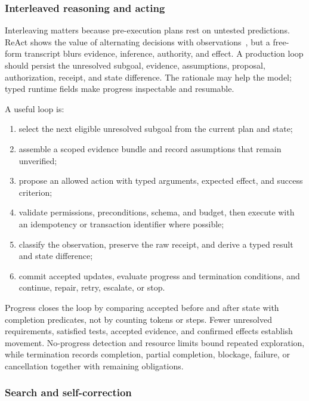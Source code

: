 \subsubsection{Interleaved reasoning and acting}

Interleaving matters because pre-execution plans rest on untested predictions. ReAct shows the value of alternating decisions with observations~\cite{yao2023react}, but a free-form transcript blurs evidence, inference, authority, and effect. A production loop should persist the unresolved subgoal, evidence, assumptions, proposal, authorization, receipt, and state difference. The rationale may help the model; typed runtime fields make progress inspectable and resumable.

A useful loop is:
\begin{enumerate}
    \item select the next eligible unresolved subgoal from the current plan and state;
    \item assemble a scoped evidence bundle and record assumptions that remain unverified;
    \item propose an allowed action with typed arguments, expected effect, and success criterion;
    \item validate permissions, preconditions, schema, and budget, then execute with an idempotency or transaction identifier where possible;
    \item classify the observation, preserve the raw receipt, and derive a typed result and state difference;
    \item commit accepted updates, evaluate progress and termination conditions, and continue, repair, retry, escalate, or stop.
\end{enumerate}
Progress closes the loop by comparing accepted before and after state with completion predicates, not by counting tokens or steps. Fewer unresolved requirements, satisfied tests, accepted evidence, and confirmed effects establish movement. No-progress detection and resource limits bound repeated exploration, while termination records completion, partial completion, blockage, failure, or cancellation together with remaining obligations.

\subsubsection{Search and self-correction}

